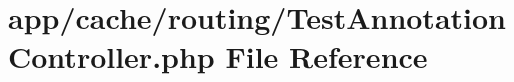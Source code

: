 \hypertarget{cache_2routing_2_test_annotation_controller_8php}{\section{app/cache/routing/\-Test\-Annotation\-Controller.php File Reference}
\label{cache_2routing_2_test_annotation_controller_8php}
}
